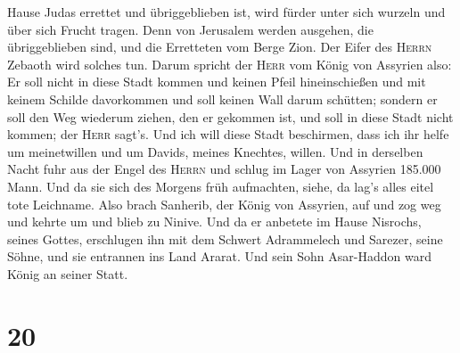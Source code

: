Hause Judas errettet und übriggeblieben ist, wird fürder unter sich
wurzeln und über sich Frucht tragen.  Denn von Jerusalem
werden ausgehen, die übriggeblieben sind, und die Erretteten vom Berge
Zion. Der Eifer des \textsc{Herrn} Zebaoth wird solches tun.
 Darum spricht der \textsc{Herr} vom König von Assyrien
also: Er soll nicht in diese Stadt kommen und keinen Pfeil
hineinschießen und mit keinem Schilde davorkommen und soll keinen Wall
darum schütten;  sondern er soll den Weg wiederum ziehen,
den er gekommen ist, und soll in diese Stadt nicht kommen; der
\textsc{Herr} sagt's.  Und ich will diese Stadt
beschirmen, dass ich ihr helfe um meinetwillen und um Davids, meines
Knechtes, willen.  Und in derselben Nacht fuhr aus der
Engel des \textsc{Herrn} und schlug im Lager von Assyrien 185.000 Mann.
Und da sie sich des Morgens früh aufmachten, siehe, da lag's alles eitel
tote Leichname.  Also brach Sanherib, der König von
Assyrien, auf und zog weg und kehrte um und blieb zu Ninive.
 Und da er anbetete im Hause Nisrochs, seines Gottes,
erschlugen ihn mit dem Schwert Adrammelech und Sarezer, seine Söhne, und
sie entrannen ins Land Ararat. Und sein Sohn Asar-Haddon ward König an
seiner Statt.

\hypertarget{section-19}{%
\section{20}\label{section-19}}

